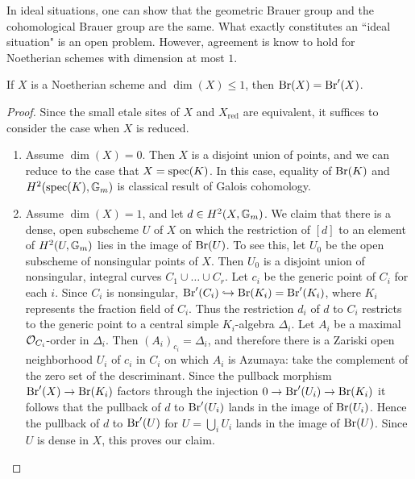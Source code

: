 In ideal situations, one can show that the geometric Brauer group and the cohomological Brauer group are the same.  What exactly constitutes an ``ideal situation" is an open problem.  However, agreement is know to hold for Noetherian schemes with dimension at most $1$.
\begin{prop}
If $X$ is a Noetherian scheme and $\dim(X)\leq 1$, then $\textnormal{Br}(X) = \textnormal{Br}'(X)$.
\end{prop}
\begin{proof}
Since the small etale sites of $X$ and $X_{\text{red}}$ are equivalent, it suffices to consider the case when $X$ is reduced.
\begin{enumerate}
\item  Assume $\dim(X) = 0$.  Then $X$ is a disjoint union of points, and we can reduce to the case that $X = \textnormal{spec}(K)$.  In this case, equality of $\textnormal{Br}(K)$ and $H^2(\textnormal{spec}(K),\mathbb{G}_m)$ is classical result of Galois cohomology.
\item
Assume $\dim(X) = 1$, and let $d\in H^2(X,\mathbb{G}_m)$.  We claim that there is a dense, open subscheme $U$ of $X$ on which the restriction of $[d]$ to an element of $H^2(U,\mathbb{G}_m)$ lies in the image of $\textnormal{Br}(U)$.  To see this, let $U_0$ be the open subscheme of nonsingular points of $X$.  Then $U_0$ is a disjoint union of nonsingular, integral curves $C_1\cup\dots\cup C_r$.  Let $c_i$ be the generic point of $C_i$ for each $i$.  Since $C_i$ is nonsingular, $\textnormal{Br}'(C_i)\hookrightarrow \textnormal{Br}(K_i)=\textnormal{Br}'(K_i)$, where $K_i$ represents the fraction field of $C_i$.  Thus the restriction $d_i$ of $d$ to $C_i$ restricts to the generic point to a central simple $K_i$-algebra $\Delta_i$.  Let $A_i$ be a maximal $\mathcal{O}_{C_i}$-order in $\Delta_i$.  Then $(A_i)_{c_i} = \Delta_i$, and therefore there is a Zariski open neighborhood $U_i$ of $c_i$ in $C_i$ on which $A_i$ is Azumaya: take the complement of the zero set of the descriminant.  Since the pullback morphism $\textnormal{Br}'(X)\rightarrow\textnormal{Br}(K_i)$ factors through the injection $0\rightarrow \textnormal{Br}'(U_i)\rightarrow\textnormal{Br}(K_i)$ it follows that the pullback of $d$ to $\textnormal{Br}'(U_i)$ lands in the image of $\textnormal{Br}(U_i)$.  Hence the pullback of $d$ to $\textnormal{Br}'(U)$ for $U=\bigcup_i U_i$ lands in the image of $\textnormal{Br}(U)$.  Since $U$ is dense in $X$, this proves our claim.


\end{enumerate}
\end{proof}
